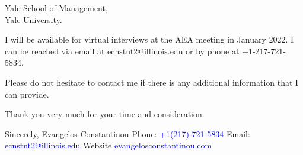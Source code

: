 \documentclass[12pt]{letter}
\begin{document}
\begin{letter}{Yale School of Management,\\
Yale University.}





I will be available for virtual interviews at the AEA meeting in January 2022.
I can be reached via email at ecnstnt2@illinois.edu or by phone at +1-217-721-5834.

Please do not hesitate to contact me if there is any additional information that I can provide.

Thank you very much for your time and consideration.


\noindent Sincerely,
\newline\noindent Evangelos Constantinou
\vspace{4mm}
\newline\noindent Phone: \textcolor{blue}{+1(217)-721-5834}
\newline\noindent Email: \textcolor{blue}{ecnstnt2@illinois.edu}
\newline\noindent Website \textcolor{blue}{evangelosconstantinou.com}
\end{letter}
\end{document}
